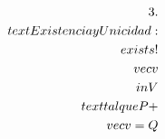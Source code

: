 \documentclass[preview]{standalone}
\begin{document}
\begin{align*}
\special{dvisvgm:raw <g id='unique000'>}3. \\text{ Existencia y Unicidad: } \\exists! \\vec{v} \\in V \\text{ tal que } P + \\vec{v} = Q\special{dvisvgm:raw </g>}
\end{align*}
\end{document}
